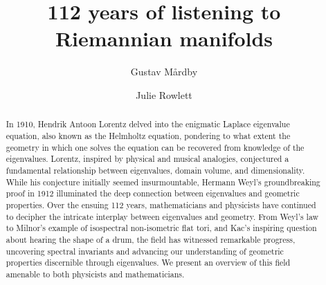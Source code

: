 \documentclass{amsart}
\theoremstyle{definition}
\begin{document}

\title{112 years of listening to Riemannian manifolds}
\author[G.\@ M\aa rdby]{Gustav M\aa rdby}
\address{Mathematical Sciences, Chalmers University of Technology and University
of Gothenburg, 412 96 Gothenburg, Sweden}

\author[J.\@ Rowlett]{Julie Rowlett}
\address{Mathematical Sciences, Chalmers University of Technology and University
of Gothenburg, 412 96 Gothenburg, Sweden}

\maketitle




\begin{abstract}
In 1910, Hendrik Antoon Lorentz delved into the enigmatic Laplace eigenvalue equation, also known as the Helmholtz equation, pondering to what extent the geometry in which one solves the equation can be recovered from knowledge of the eigenvalues. Lorentz, inspired by physical and musical analogies, conjectured a fundamental relationship between eigenvalues, domain volume, and dimensionality. While his conjecture initially seemed insurmountable, Hermann Weyl's groundbreaking proof in 1912 illuminated the deep connection between eigenvalues and geometric properties. Over the ensuing 112 years, mathematicians and physicists have continued to decipher the intricate interplay between eigenvalues and geometry. From Weyl's law to Milnor's example of isospectral non-isometric flat tori, and Kac's inspiring question about hearing the shape of a drum, the field has witnessed remarkable progress, uncovering spectral invariants and advancing our understanding of geometric properties discernible through eigenvalues.  We present an overview of this field amenable to both physicists and mathematicians.
\end{abstract}
\end{document}
